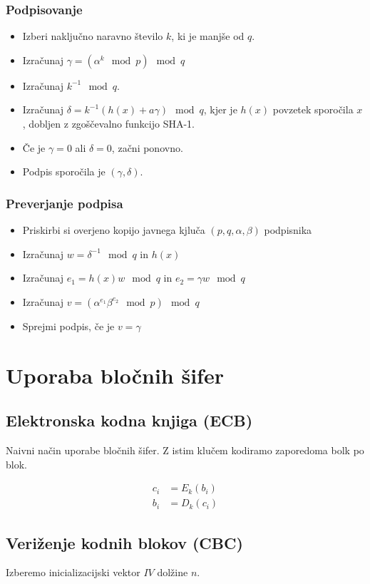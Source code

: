 \begin{multicols}{5}
\subsubsection*{Podpisovanje}
\begin{itemize}
	\item Izberi naključno naravno število $k$, ki je manjše od $q$.
	\item Izračunaj $\gamma = \left( \alpha^k \mod p\right) \mod q$
	\item Izračunaj $k^{-1} \mod q$.
	\item Izračunaj $\delta = k^{-1}(h(x) + a\gamma) \mod q$, kjer je $h(x)$ povzetek sporočila $x$, dobljen z zgoščevalno funkcijo SHA-1.
	\item Če je $\gamma = 0$ ali $\delta = 0$, začni ponovno.
	\item Podpis sporočila je $(\gamma, \delta)$.
\end{itemize}

\subsubsection*{Preverjanje podpisa}
\begin{itemize}
	\item Priskirbi si overjeno kopijo javnega kjluča $(p,q,\alpha,\beta)$ podpisnika
	\item Izračunaj $w = \delta^{-1} \mod q$ in $h(x)$
	\item Izračunaj $e_1 = h(x)w \mod q$ in $e_2 = \gamma w \mod q$
	\item Izračunaj $v = (\alpha^{e_1} \beta^{e_2} \mod p ) \mod q $
	\item Sprejmi podpis, če je $v = \gamma$
\end{itemize}


\section*{Uporaba bločnih šifer}
\subsection*{Elektronska kodna knjiga (ECB)}
Naivni način uporabe bločnih šifer. Z istim klučem kodiramo zaporedoma bolk po blok.

\begin{align*}
	c_i &= E_k(b_i) \\
	b_i &= D_k(c_i)
\end{align*}

\subsection*{Veriženje kodnih blokov (CBC)}
Izberemo inicializacijski vektor $IV$ dolžine $n$.


\end{multicols}
